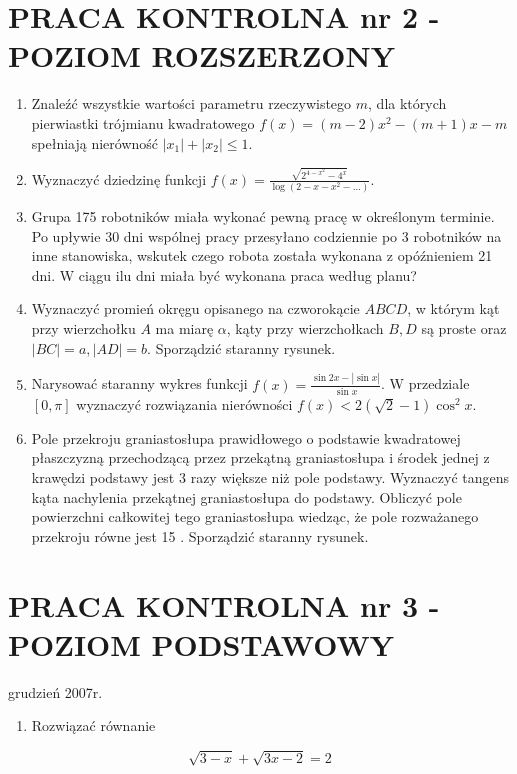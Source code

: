 \documentclass[10pt]{article}
\begin{document}
\section*{PRACA KONTROLNA nr 2 - POZIOM ROZSZERZONY}
\begin{enumerate}
  \item Znaleźć wszystkie wartości parametru rzeczywistego $m$, dla których pierwiastki trójmianu kwadratowego $f(x)=(m-2) x^{2}-(m+1) x-m$ spełniają nierówność $\left|x_{1}\right|+\left|x_{2}\right| \leqslant 1$.
  \item Wyznaczyć dziedzinę funkcji $f(x)=\frac{\sqrt{2^{4-x^{2}}-4^{x}}}{\log \left(2-x-x^{2}-\ldots\right)}$.
  \item Grupa 175 robotników miała wykonać pewną pracę w określonym terminie. Po upływie 30 dni wspólnej pracy przesyłano codziennie po 3 robotników na inne stanowiska, wskutek czego robota została wykonana z opóźnieniem 21 dni. W ciągu ilu dni miała być wykonana praca według planu?
  \item Wyznaczyć promień okręgu opisanego na czworokącie $A B C D$, w którym kąt przy wierzchołku $A$ ma miarę $\alpha$, kąty przy wierzchołkach $B, D$ są proste oraz $|B C|=a,|A D|=b$. Sporządzić staranny rysunek.
  \item Narysować staranny wykres funkcji $f(x)=\frac{\sin 2 x-|\sin x|}{\sin x}$. W przedziale $[0, \pi]$ wyznaczyć rozwiązania nierówności $f(x)<2(\sqrt{2}-1) \cos ^{2} x$.
  \item Pole przekroju graniastosłupa prawidłowego o podstawie kwadratowej płaszczyzną przechodzącą przez przekątną graniastosłupa i środek jednej z krawędzi podstawy jest 3 razy większe niż pole podstawy. Wyznaczyć tangens kąta nachylenia przekątnej graniastosłupa do podstawy. Obliczyć pole powierzchni całkowitej tego graniastosłupa wiedząc, że pole rozważanego przekroju równe jest 15 . Sporządzić staranny rysunek.
\end{enumerate}

\section*{PRACA KONTROLNA nr 3 - POZIOM PODSTAWOWY}
grudzień 2007r.

\begin{enumerate}
  \item Rozwiązać równanie
\end{enumerate}

$$
\sqrt{3-x}+\sqrt{3 x-2}=2
$$
\end{document}
